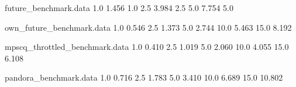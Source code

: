\begin{filecontents}{future_benchmark.data}
1.0 1.456	1.0
2.5 3.984	2.5
5.0 7.754	5.0
\end{filecontents}

\begin{filecontents}{own_future_benchmark.data}
1.0 0.546
2.5 1.373
5.0 2.744
10.0 5.463
15.0 8.192
\end{filecontents}

\begin{filecontents}{mpscq_throttled_benchmark.data}
1.0 0.410	
2.5 1.019	
5.0 2.060	
10.0 4.055	
15.0 6.108	
\end{filecontents}

\begin{filecontents}{pandora_benchmark.data}
1.0 0.716	
2.5 1.783	
5.0 3.410	
10.0 6.689
15.0 10.802
\end{filecontents}
